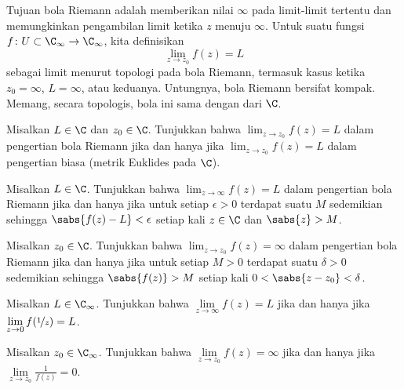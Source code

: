 
Tujuan bola Riemann adalah memberikan nilai $\infty$ pada limit-limit tertentu
dan memungkinkan pengambilan limit ketika $z$ menuju $\infty$.  Untuk suatu
fungsi $f \colon U \subset \C_\infty \to \C_\infty$, kita definisikan
\begin{equation*}
\lim_{z \to z_0} f(z) = L
\end{equation*}
sebagai limit menurut topologi pada bola Riemann,
termasuk
kasus ketika $z_0 = \infty$, $L = \infty$, atau keduanya.
Untungnya, bola Riemann bersifat kompak.
Memang, secara topologis, bola ini sama dengan
 dari $\C$.

\begin{exbox}
\begin{exercise}%
Misalkan $L \in \C$ dan $z_0 \in \C$.
Tunjukkan bahwa $\lim_{z\to z_0} f(z) = L$ dalam pengertian bola Riemann
jika dan hanya jika $\lim_{z \to z_0} f(z) = L$ dalam pengertian biasa (metrik Euklides
pada $\C$).
\end{exercise}

\begin{exercise}%
Misalkan $L \in \C$.
Tunjukkan bahwa $\lim_{z\to \infty} f(z) = L$ dalam pengertian bola Riemann
jika dan hanya jika untuk setiap $\epsilon > 0$ terdapat suatu $M$ sedemikian sehingga
$\sabs{f(z)-L} < \epsilon$ setiap kali $z \in \C$ dan $\sabs{z} > M$.
\end{exercise}

\begin{exercise}%
Misalkan $z_0 \in \C$.
Tunjukkan bahwa $\lim_{z\to z_0} f(z) = \infty$ dalam pengertian bola Riemann
jika dan hanya jika untuk setiap $M > 0$ terdapat suatu $\delta > 0$ sedemikian sehingga
$\sabs{f(z)} > M$ setiap kali $0 < \sabs{z-z_0} < \delta$.
\end{exercise}

\begin{exercise}%
Misalkan $L \in \C_\infty$.
Tunjukkan bahwa $\lim\limits_{z\to\infty} f(z) = L$ jika dan hanya jika
$\lim\limits_{z \to 0} f(\nicefrac{1}{z}) = L$.
\end{exercise}

\begin{exercise}%
Misalkan $z_0 \in \C_\infty$.
Tunjukkan bahwa $\lim\limits_{z\to z_0} f(z) = \infty$ jika dan hanya jika
$\lim\limits_{z \to z_0} \frac{1}{f(z)} = 0$.
\end{exercise}
\end{exbox}
